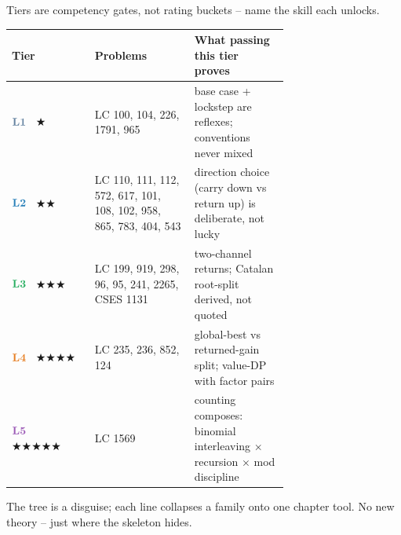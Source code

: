 
Tiers are competency gates, not rating buckets -- name the skill each unlocks.

\begin{center}
\small
\renewcommand{\arraystretch}{1.3}
\begin{tabular}{@{}lp{0.36\linewidth}p{0.34\linewidth}@{}}
\toprule
\textbf{Tier} & \textbf{Problems} & \textbf{What passing this tier proves} \\
\midrule
$\lv1$ \ $\bigstar$
  & LC 100, 104, 226, 1791, 965
  & base case + lockstep are reflexes; conventions never mixed \\
$\lv2$ \ $\bigstar\bigstar$
  & LC 110, 111, 112, 572, 617, 101, 108, 102, 958, 865, 783, 404, 543
  & direction choice (carry down vs return up) is deliberate, not lucky \\
$\lv3$ \ $\bigstar\bigstar\bigstar$
  & LC 199, 919, 298, 96, 95, 241, 2265, CSES 1131
  & two-channel returns; Catalan root-split derived, not quoted \\
$\lv4$ \ $\bigstar\bigstar\bigstar\bigstar$
  & LC 235, 236, 852, 124
  & global-best vs returned-gain split; value-DP with factor pairs \\
$\lv5$ \ $\bigstar\bigstar\bigstar\bigstar\bigstar$
  & LC 1569
  & counting composes: binomial interleaving $\times$ recursion $\times$ mod discipline \\
\bottomrule
\end{tabular}
\end{center}


The tree is a disguise; each line collapses a family onto one chapter tool. No new
theory -- just where the skeleton hides.

